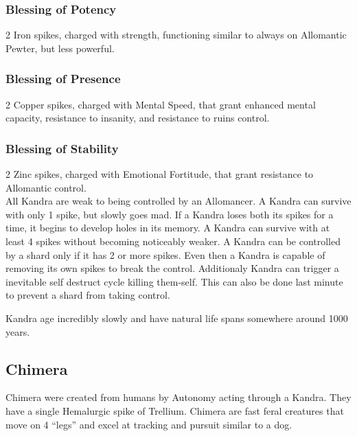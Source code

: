 \documentclass[conference]{IEEEtran}
\begin{document}
\subsubsection*{\textbf{Blessing of Potency}}
2 Iron spikes, charged with strength, functioning similar to always on Allomantic Pewter, but less powerful.\cite{WoF}\cite{kandra-blessing}\cite{HE-TB}
\subsubsection*{\textbf{Blessing of Presence}}
2 Copper spikes, charged with Mental Speed, that grant enhanced mental capacity, resistance to insanity, and resistance to ruins control.\cite{WoF}\cite{HoA-CH24}\cite{kandra-presence}\cite{kandra-blessing}\cite{HE-TB}
\subsubsection*{\textbf{Blessing of Stability}}
2 Zinc spikes, charged with Emotional Fortitude, that grant resistance to Allomantic control.\cite{WoF}\cite{kandra-blessing}\cite{HE-TB}\\

All Kandra are weak to being controlled by an Allomancer.\cite{WoA-CH40}
A Kandra can survive with only 1 spike,\cite{SoS-CH7} but slowly goes mad.  \cite{SoS-CH7}
If a Kandra loses both its spikes for a time, it begins to develop holes in its memory.\cite{BoM-CH30}
A Kandra can survive with at least 4 spikes without becoming noticeably weaker.\cite{HoA-CH20}
A Kandra can be controlled by a shard only if it has 2 or more spikes.\cite{SoS-CH7}\cite{SoS-CH26}  Even then a Kandra is capable of removing its own spikes to break the control.\cite{HoA-CH77}
Additionaly Kandra can trigger a inevitable self destruct cycle killing them-self.  This can also be done last minute to prevent a shard from taking control.\cite{SoS-CH26}

Kandra age incredibly slowly and have natural life spans somewhere around 1000 years.\cite{kandra-age} 
\subsection*{\textbf{Chimera}}
Chimera\cite{chimera} were created from humans by Autonomy acting through a Kandra.  They have a single Hemalurgic spike of Trellium.
Chimera are fast feral creatures that move on 4 ``legs'' and excel at tracking and pursuit similar to a dog.\cite{SoS-CH21}
\end{document}

